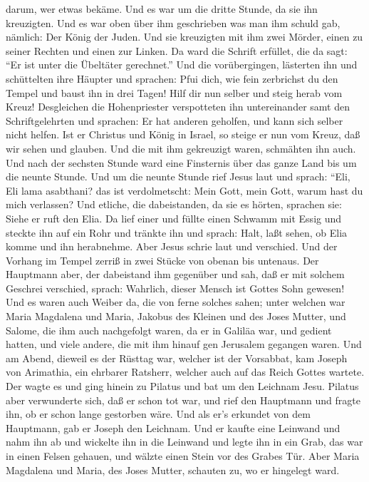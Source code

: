 darum, wer etwas bekäme.  Und es war um die dritte Stunde,
da sie ihn kreuzigten.  Und es war oben über ihm
geschrieben was man ihm schuld gab, nämlich: Der König der Juden.
 Und sie kreuzigten mit ihm zwei Mörder, einen zu seiner
Rechten und einen zur Linken.  Da ward die Schrift
erfüllet, die da sagt: ``Er ist unter die Übeltäter gerechnet.''
 Und die vorübergingen, lästerten ihn und schüttelten ihre
Häupter und sprachen: Pfui dich, wie fein zerbrichst du den Tempel und
baust ihn in drei Tagen!  Hilf dir nun selber und steig
herab vom Kreuz!  Desgleichen die Hohenpriester
verspotteten ihn untereinander samt den Schriftgelehrten und sprachen:
Er hat anderen geholfen, und kann sich selber nicht helfen.
 Ist er Christus und König in Israel, so steige er nun vom
Kreuz, daß wir sehen und glauben. Und die mit ihm gekreuzigt waren,
schmähten ihn auch.  Und nach der sechsten Stunde ward eine
Finsternis über das ganze Land bis um die neunte Stunde. 
Und um die neunte Stunde rief Jesus laut und sprach: ``Eli, Eli lama
asabthani? das ist verdolmetscht: Mein Gott, mein Gott, warum hast du
mich verlassen?  Und etliche, die dabeistanden, da sie es
hörten, sprachen sie: Siehe er ruft den Elia.  Da lief
einer und füllte einen Schwamm mit Essig und steckte ihn auf ein Rohr
und tränkte ihn und sprach: Halt, laßt sehen, ob Elia komme und ihn
herabnehme.  Aber Jesus schrie laut und verschied.
 Und der Vorhang im Tempel zerriß in zwei Stücke von obenan
bis untenaus.  Der Hauptmann aber, der dabeistand ihm
gegenüber und sah, daß er mit solchem Geschrei verschied, sprach:
Wahrlich, dieser Mensch ist Gottes Sohn gewesen!  Und es
waren auch Weiber da, die von ferne solches sahen; unter welchen war
Maria Magdalena und Maria, Jakobus des Kleinen und des Joses Mutter, und
Salome,  die ihm auch nachgefolgt waren, da er in Galiläa
war, und gedient hatten, und viele andere, die mit ihm hinauf gen
Jerusalem gegangen waren.  Und am Abend, dieweil es der
Rüsttag war, welcher ist der Vorsabbat,  kam Joseph von
Arimathia, ein ehrbarer Ratsherr, welcher auch auf das Reich Gottes
wartete. Der wagte es und ging hinein zu Pilatus und bat um den Leichnam
Jesu.  Pilatus aber verwunderte sich, daß er schon tot war,
und rief den Hauptmann und fragte ihn, ob er schon lange gestorben wäre.
 Und als er's erkundet von dem Hauptmann, gab er Joseph den
Leichnam.  Und er kaufte eine Leinwand und nahm ihn ab und
wickelte ihn in die Leinwand und legte ihn in ein Grab, das war in einen
Felsen gehauen, und wälzte einen Stein vor des Grabes Tür. 
Aber Maria Magdalena und Maria, des Joses Mutter, schauten zu, wo er
hingelegt ward.

